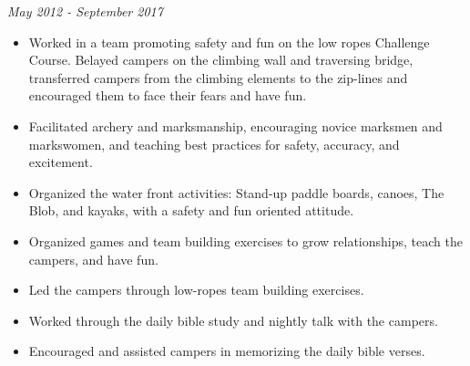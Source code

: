 \documentclass[letterpaper,10pt]{article}
\providecommand{\tightlist}
  {\setlength{\itemsep}{4pt}\setlength{\parskip}{0pt}}
\begin{document}
    \hfill \emph{May 2012 - September 2017}

    \begin{itemize}
        \tightlist{}
        \item
        Worked in a team promoting safety and fun on the low ropes Challenge Course.
        Belayed campers on the climbing wall and traversing bridge, transferred campers from the climbing elements to the zip-lines and encouraged them to face their fears and have fun.
        \item
        Facilitated archery and marksmanship, encouraging novice marksmen and markswomen, and teaching best practices for safety, accuracy, and excitement.
        \item
        Organized the water front activities: Stand-up paddle boards, canoes, The Blob, and kayaks, with a safety and fun oriented attitude.
        \item
        Organized games and team building exercises to grow relationships, teach the campers, and have fun.
        \item
        Led the campers through low-ropes team building exercises.
        \item
        Worked through the daily bible study and nightly talk with the campers.
        \item
        Encouraged and assisted campers in memorizing the daily bible verses.
    \end{itemize}
\end{document}
